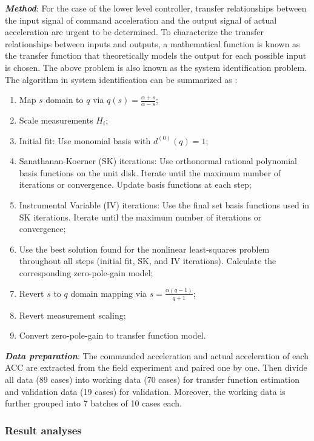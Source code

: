 \documentclass[a4paper]{cas-sc}
\begin{document}
\textbf{\emph{Method}}: For the case of the lower level controller, transfer relationships between the input signal of command acceleration and the output signal of actual acceleration are urgent to be determined. To characterize the transfer relationships between inputs and outputs, a mathematical function is known as the transfer function that theoretically models the output for each possible input is chosen. The above problem is also known as the system identification problem. The algorithm in system identification can be summarized as \citep{Ozdemir2017,Kollar2006,Ljung1995}:
\begin{enumerate}
  \item Map $s$ domain to $q$ via $q(s)=\frac{\alpha+s}{\alpha-s}$;
  \item Scale measurements $H_i$;
  \item Initial fit: Use monomial basis with $d^{(0)}(q)=1$;
  \item Sanathanan-Koerner (SK) iterations: Use orthonormal rational polynomial basis functions on the unit disk. Iterate until the maximum number of iterations or convergence. Update basis functions at each step;
  \item Instrumental Variable (IV) iterations: Use the final set basis functions used in SK iterations. Iterate until the maximum number of iterations or convergence;
  \item Use the best solution found for the nonlinear least-squares problem throughout all steps (initial fit, SK, and IV iterations). Calculate the corresponding zero-pole-gain model;
  \item Revert $s$ to $q$ domain mapping via $s=\frac{\alpha(q-1)}{q+1}$;
  \item Revert measurement scaling;
  \item Convert zero-pole-gain to transfer function model.
\end{enumerate}

\textbf{\emph{Data preparation}}: The commanded acceleration and actual acceleration of each ACC are extracted from the field experiment and paired one by one. Then divide all data (89 cases) into working data (70 cases) for transfer function estimation and validation data (19 cases) for validation. Moreover, the working data is further grouped into 7 batches of 10 cases each.



\subsubsection{Result analyses}
\label{Section 3.3.2}
\end{document}
